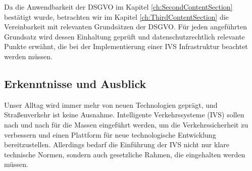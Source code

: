 Da die Anwendbarkeit der DSGVO im Kapitel \ref{ch:SecondContentSection} bestätigt wurde, betrachten wir im Kapitel \ref{ch:ThirdContentSection} die Vereinbarkeit mit relevanten Grundsätzen der DSGVO. Für jeden angeführten Grundsatz wird dessen Einhaltung geprüft und datenschutzrechtlich relevante Punkte erwähnt, die bei der Implementierung einer IVS Infrastruktur beachtet werden müssen.


\subsection{Erkenntnisse und Ausblick}

Unser Alltag wird immer mehr von neuen Technologien geprägt, und Straßenverkehr ist keine Ausnahme. Intelligente Verkehrssysteme (IVS) sollen nach und nach für die Massen eingeführt werden, um die Verkehrssicherheit zu verbessern und einen Plattform für neue technologische Entwicklung bereitzustellen. Allerdings bedarf die Einführung der IVS nicht nur klare technische Normen, sondern auch gesetzliche Rahmen, die eingehalten werden müssen. 







